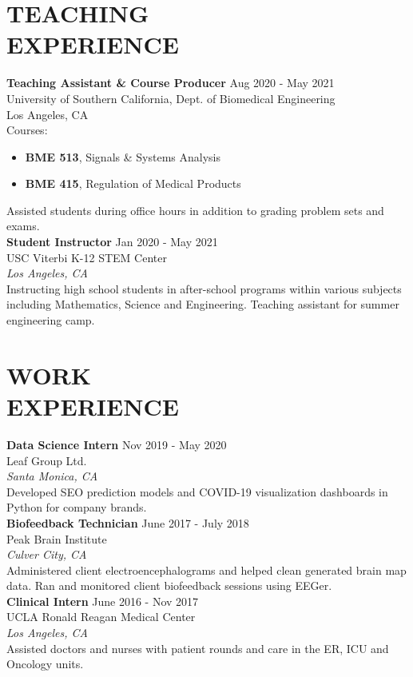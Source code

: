 \documentclass[margin, 10pt]{res} %
\begin{document}
\begin{resume}
\section{TEACHING \\ EXPERIENCE} 
{\bf Teaching Assistant \& Course Producer} \hfill {Aug 2020 - May 2021} \\ 
University of Southern California, Dept. of Biomedical Engineering \\
Los Angeles, CA \\
Courses:
\begin{itemize} \itemsep -2pt
    \item \textbf{BME 513}, Signals \& Systems Analysis
    \item \textbf{BME 415}, Regulation of Medical Products
\end{itemize}
\vspace{-0.35 cm}
Assisted students during office hours in addition to grading problem sets and exams. \\
\newline
{\bf Student Instructor} \hfill {Jan 2020 - May 2021} \\ USC Viterbi K-12 STEM Center \\
\emph{Los Angeles, CA} \\
Instructing high school students in after-school programs within various subjects including Mathematics, Science and Engineering. Teaching assistant for summer engineering camp.

 
\section{WORK \\ EXPERIENCE}
{\bf Data Science Intern} \hfill {Nov 2019 - May 2020} \\
Leaf Group Ltd. \\
\emph{Santa Monica, CA} \\
Developed SEO prediction models and COVID-19 visualization dashboards in Python for company brands. \\
{\bf Biofeedback Technician} \hfill {June 2017 - July 2018} \\
Peak Brain Institute \\ 
\emph{Culver City, CA} \\
Administered client electroencephalograms and helped clean generated brain map data. Ran and monitored client biofeedback sessions using EEGer. \\
\newline
{\bf Clinical Intern} \hfill {June 2016 - Nov 2017} \\
UCLA Ronald Reagan Medical Center \\ 
\emph{Los Angeles, CA} \\
Assisted doctors and nurses with patient rounds and care in the ER, ICU and Oncology units. 


\end{resume}
\end{document}
